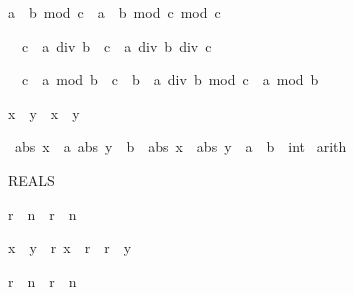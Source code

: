 \begin{isabellebody}
\begin{isamarkuptext}
\begin{isabelle}%
a\ {\isacharasterisk}\ b\ mod\ c\ {\isacharequal}\ a\ {\isacharasterisk}\ {\isacharparenleft}b\ mod\ c{\isacharparenright}\ mod\ c%
\end{isabelle}

\begin{isabelle}%
{\isacharhash}{}\ {\isacharless}\ c\ {\isasymLongrightarrow}\ a\ div\ {\isacharparenleft}b\ {\isacharasterisk}\ c{\isacharparenright}\ {\isacharequal}\ a\ div\ b\ div\ c%
\end{isabelle}

\begin{isabelle}%
{\isacharhash}{}\ {\isacharless}\ c\ {\isasymLongrightarrow}\ a\ mod\ {\isacharparenleft}b\ {\isacharasterisk}\ c{\isacharparenright}\ {\isacharequal}\ b\ {\isacharasterisk}\ {\isacharparenleft}a\ div\ b\ mod\ c{\isacharparenright}\ {\isacharplus}\ a\ mod\ b%
\end{isabelle}

\begin{isabelle}%
{\isasymbar}x\ {\isacharasterisk}\ y{\isasymbar}\ {\isacharequal}\ {\isasymbar}x{\isasymbar}\ {\isacharasterisk}\ {\isasymbar}y{\isasymbar}%
\end{isabelle}
%
\end{isamarkuptext}%
\ {\isachardoublequote}{\isasymlbrakk}abs\ x\ {\isacharless}\ a{\isacharsemicolon}\ abs\ y\ {\isacharless}\ b{\isasymrbrakk}\ {\isasymLongrightarrow}\ abs\ x\ {\isacharplus}\ abs\ y\ {\isacharless}\ {\isacharparenleft}a\ {\isacharplus}\ b\ {\isacharcolon}{\isacharcolon}\ int{\isacharparenright}{\isachardoublequote}\isanewline
{}\ arith%
\begin{isamarkuptext}%
REALS

\begin{isabelle}%
{\isasymbar}r{\isasymbar}\ {\isacharcircum}\ n\ {\isacharequal}\ {\isasymbar}r\ {\isacharcircum}\ n{\isasymbar}%
\end{isabelle}

\begin{isabelle}%
x\ {\isacharless}\ y\ {\isasymLongrightarrow}\ {\isasymexists}r{\isachardot}\ x\ {\isacharless}\ r\ {\isasymand}\ r\ {\isacharless}\ y%
\end{isabelle}

\begin{isabelle}%
{\isasymbar}r{\isasymbar}\ {\isacharcircum}\ n\ {\isacharequal}\ {\isasymbar}r\ {\isacharcircum}\ n{\isasymbar}%
\end{isabelle}


\end{isamarkuptext}
\end{isabellebody}
